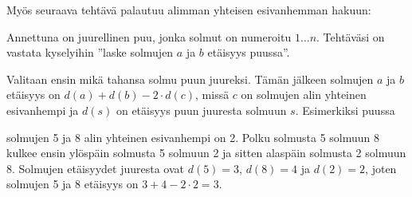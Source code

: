 Myös seuraava tehtävä palautuu alimman yhteisen
esivanhemman hakuun:
\begin{task}
Annettuna on juurellinen puu, jonka solmut on numeroitu $1 \ldots n$.
Tehtäväsi on vastata kyselyihin
''laske solmujen $a$ ja $b$ etäisyys puussa''.
\end{task}

Valitaan ensin mikä tahansa
solmu puun juureksi.
Tämän jälkeen solmujen $a$ ja $b$
etäisyys on $d(a)+d(b)-2 \cdot d(c)$,
missä $c$ on solmujen alin yhteinen esivanhempi
ja $d(s)$ on etäisyys puun juuresta solmuun $s$.
Esimerkiksi puussa

\begin{center}
\end{center}
solmujen 5 ja 8 alin yhteinen esivanhempi on 2.
Polku solmusta 5 solmuun 8
kulkee ensin ylöspäin solmusta 5
solmuun 2 ja sitten alaspäin
solmusta 2 solmuun 8.
Solmujen etäisyydet juuresta ovat $d(5)=3$,
$d(8)=4$ ja $d(2)=2$,
joten solmujen 5 ja 8 etäisyys
on $3+4-2\cdot2=3$.


